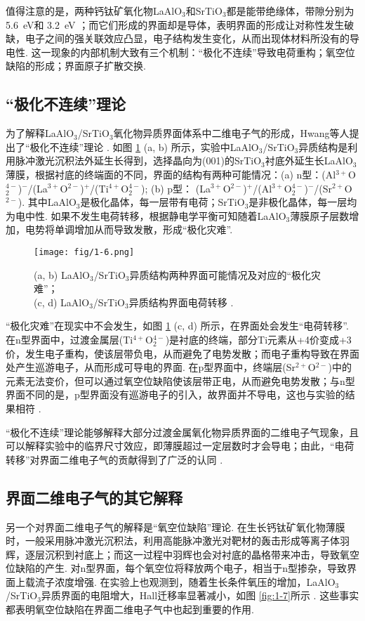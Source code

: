 \documentclass[12pt,a4paper,openany,twoside,UTF-8]{book}
\begin{document}
值得注意的是，两种钙钛矿氧化物LaAlO$_3$和SrTiO$_3$都是能带绝缘体，带隙分别为 \SI{5.6}{eV}和 \SI{3.2}{eV} \cite{ref7}；而它们形成的界面却是导体，表明界面的形成让对称性发生破缺，电子之间的强关联效应凸显，电子结构发生变化，从而出现体材料所没有的导电性. 这一现象的内部机制大致有三个机制：“极化不连续”导致电荷重构；氧空位缺陷的形成；界面原子扩散交换.

\subsection{“极化不连续”理论}
为了解释LaAlO$_3$/SrTiO$_3$氧化物异质界面体系中二维电子气的形成，Hwang等人提出了“极化不连续”理论 \cite{ref8}. 如图 \ref{fig:1-6} (a, b) 所示，实验中LaAlO$_3$/SrTiO$_3$异质结构是利用脉冲激光沉积法外延生长得到，选择晶向为(001)的SrTiO$_3$衬底外延生长LaAlO$_3$薄膜，根据衬底的终端面的不同，界面的结构有两种可能情况：(a) n型：(Al$^{3+}$O$_2^{4-}$)$^-$/(La$^{3+}$O$^{2-}$)$^+$/(Ti$^{4+}$O$_2^{4-}$); (b) p型： (La$^{3+}$O$^{2-}$)$^+$/(Al$^{3+}$O$_2^{4-}$)$^-$/(Sr$^{2+}$O$^{2-}$). 其中LaAlO$_3$是极化晶体，每一层带有电荷；SrTiO$_3$是非极化晶体，每一层均为电中性. 如果不发生电荷转移，根据静电学平衡可知随着LaAlO$_3$薄膜原子层数增加，电势将单调增加从而导致发散，形成“极化灾难”.

\begin{figure}[htbp]
\centering
\texttt{[image: fig/1-6.png]}
\caption{(a, b) LaAlO$_3$/SrTiO$_3$异质结构两种界面可能情况及对应的“极化灾难”；\\
(c, d) LaAlO$_3$/SrTiO$_3$异质结构界面电荷转移 \cite{ref8}.}
\label{fig:1-6} 
\end{figure}

“极化灾难”在现实中不会发生，如图 \ref{fig:1-6} (c, d) 所示，在界面处会发生“电荷转移”. 在n型界面中，过渡金属层(Ti$^{4+}$O$_2^{4-}$)是衬底的终端，部分Ti元素从+4价变成+3价，发生电子重构，使该层带负电，从而避免了电势发散；而电子重构导致在界面处产生巡游电子，从而形成可导电的界面. 在p型界面中，终端层(Sr$^{2+}$O$^{2-}$)中的元素无法变价，但可以通过氧空位缺陷使该层带正电，从而避免电势发散；与n型界面不同的是，p型界面没有巡游电子的引入，故界面并不导电，这也与实验的结果相符 \cite{ref8}.

“极化不连续”理论能够解释大部分过渡金属氧化物异质界面的二维电子气现象，且可以解释实验中的临界尺寸效应，即薄膜超过一定层数时才会导电；由此，“电荷转移”对界面二维电子气的贡献得到了广泛的认同 \cite{ref9}.

\subsection{界面二维电子气的其它解释}
另一个对界面二维电子气的解释是“氧空位缺陷”理论. 在生长钙钛矿氧化物薄膜时，一般采用脉冲激光沉积法，利用高能脉冲激光对靶材的轰击形成等离子体羽辉，逐层沉积到衬底上；而这一过程中羽辉也会对衬底的晶格带来冲击，导致氧空位缺陷的产生. 对n型界面，每个氧空位将释放两个电子，相当于n型掺杂，导致界面上载流子浓度增强. 在实验上也观测到，随着生长条件氧压的增加，LaAlO$_3$/SrTiO$_3$异质界面的电阻增大，Hall迁移率显著减小，如图 \ref{fig:1-7}所示 \cite{ref10}. 这些事实都表明氧空位缺陷在界面二维电子气中也起到重要的作用.
\end{document}
